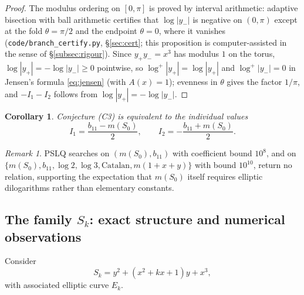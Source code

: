\documentclass[preprint,12pt]{elsarticle}
\newtheorem{corollary}[theorem]{Corollary}
\theoremstyle{definition}
\theoremstyle{remark}
\newtheorem{remark}[theorem]{Remark}
\begin{document}
\begin{proof}
The modulus ordering on $[0,\pi]$ is proved by interval arithmetic:
adaptive bisection with ball arithmetic certifies that $\log|y_-|$ is
negative on $(0,\pi)$ except at the fold $\theta=\pi/2$ and the endpoint
$\theta=0$, where it vanishes (\texttt{code/branch\_certify.py},
\S\ref{sec:cert}; this proposition is computer-assisted in the sense of
\S\ref{subsec:rigour}). Since
$y_+y_-=x^3$ has modulus $1$ on the torus, $\log|y_+|=-\log|y_-|\ge 0$
pointwise, so $\log^+|y_+|=\log|y_+|$ and $\log^+|y_-|=0$ in Jensen's
formula \eqref{eq:jensen} (with $A(x)=1$); evenness in $\theta$ gives the
factor $1/\pi$, and $-I_1-I_2$ follows from $\log|y_+|=-\log|y_-|$.
\end{proof}

\begin{corollary}
Conjecture \emph{(C3)} is equivalent to the individual values
\[
  I_1=\frac{b_{11}-m(S_0)}{2},\qquad I_2=-\frac{b_{11}+m(S_0)}{2}.
\]
\end{corollary}

\begin{remark}
PSLQ searches on $(m(S_0),b_{11})$ with coefficient bound $10^8$, and on
$\{m(S_0),b_{11},\log2,\log3,\mathrm{Catalan},m(1+x+y)\}$ with bound
$10^{10}$, return no relation, supporting the expectation that $m(S_0)$
itself requires elliptic dilogarithms rather than elementary constants.
\end{remark}

\subsection{The family \texorpdfstring{$S_k$}{Sk}: exact structure and
numerical observations}
\label{subsec:familythm}

Consider
\[
  S_k=y^2+(x^2+kx+1)y+x^3,
\]
with associated elliptic curve $E_k$.
\end{document}
